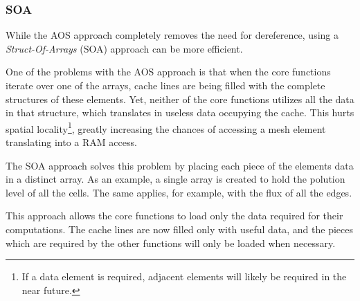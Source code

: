 \subsubsection{SOA}
\label{sec:322}


While the AOS approach completely removes the need for dereference, using a \textit{Struct-Of-Arrays} (SOA) approach can be more efficient.

One of the problems with the AOS approach is that when the core functions iterate over one of the arrays, cache lines are being filled with the complete structures of these elements.
Yet, neither of the core functions utilizes all the data in that structure, which translates in useless data occupying the cache.
This hurts spatial locality\footnote{If a data element is required, adjacent elements will likely be required in the near future.}, greatly increasing the chances of accessing a mesh element translating into a RAM access.

The SOA approach solves this problem by placing each piece of the elements data in a distinct array. As an example, a single array is created to hold the polution level of all the cells.
The same applies, for example, with the flux of all the edges.

This approach allows the core functions to load only the data required for their computations.
The cache lines are now filled only with useful data, and the pieces which are required by the other functions will only be loaded when necessary.
